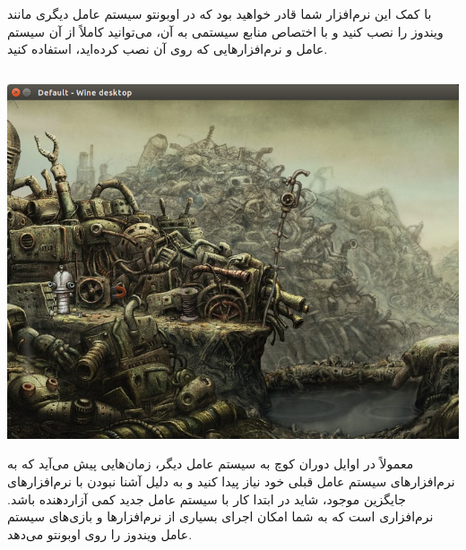 با کمک این نرم‌افزار شما قادر خواهید بود که در اوبونتو سیستم عامل دیگری مانند ویندوز را نصب کنید و با اختصاص منابع سیستمی به آن، می‌توانید کاملاً از آن سیستم عامل و نرم‌افزارهایی که روی آن نصب کرده‌اید، استفاده کنید.

\subsection[Wine]{}

\begin{center}
\includegraphics[scale=0.4]{pics/47.png}
\end{center}

معمولاً در اوایل دوران کوچ به سیستم عامل دیگر، زمان‌هایی پیش می‌آید که به نرم‌افزارهای سیستم عامل قبلی خود نیاز پیدا کنید و به دلیل آشنا نبودن با نرم‌افزارهای جایگزین موجود، شاید در ابتدا کار با سیستم عامل جدید کمی آزار‌دهنده باشد.  نرم‌افزاری است که به شما امکان اجرای بسیاری از نرم‌افزارها و بازی‌های سیستم عامل ویندوز را روی اوبونتو می‌دهد.

\subsection[Goldendict]{}

